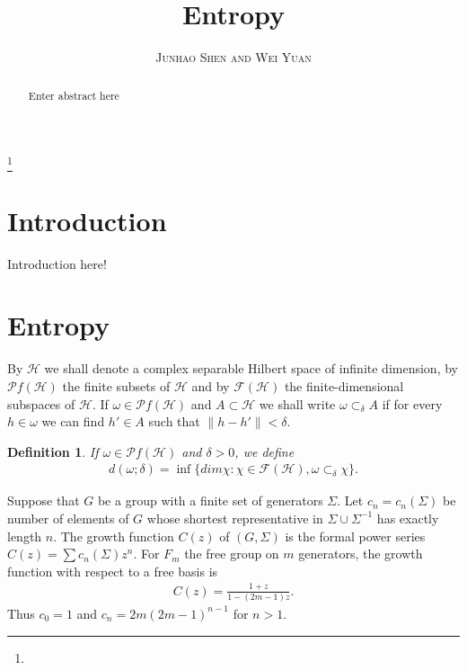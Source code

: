 \documentclass[a4paper,10pt]{amsart}
\newtheorem{definition}{Definition}[section]
\newcommand{\HHH}{\mathscr H} %
\newcommand{\PP}{\mathscr P}
\newcommand{\FF}{\mathscr F}
\newcommand{\titleinfo}{Entropy}
\newcommand{\authorinfo}{Junhao Shen and Wei Yuan}
\begin{document}
\title{\LARGE\textbf{\titleinfo}} 
\author{\large\textsc{\authorinfo}} 
\address{UNH and AMSS}  
\email{}

\date{}

\begin{abstract}
Enter abstract here
\end{abstract}

\thanks{}
\maketitle


\section{Introduction}
Introduction here!


\section{Entropy}
By $\HHH$ we shall denote a complex separable Hilbert space of 
infinite dimension, by $\PP f(\HHH)$ the finite subsets of $\HHH$ and 
by $\FF(\HHH)$ the finite-dimensional subspaces of $\HHH$.
If $\omega \in \PP f(\HHH)$ and $A \subset \HHH$ we shall write
$\omega \subset_{\delta} A$ if for every $h \in \omega$ we can find
$h' \in A$ such that $\| h - h' \| < \delta$.

\begin{definition}
    If $\omega \in \PP f(\HHH)$ and $\delta > 0$, we define
    \begin{align*}
        d(\omega; \delta) = \inf \{dim \chi : \chi \in \FF (\HHH), \omega
        \subset_{\delta} \chi \}.
    \end{align*}
\end{definition}

Suppose that $G$ be a group with a finite set of generators $\Sigma$. 
Let $c_n = c_n(\Sigma)$ be 
number of elements of $G$ whose shortest representative in 
$\Sigma \cup \Sigma^{-1}$ has exactly length $n$. The growth function
$C(z)$ of $(G, \Sigma)$ is the formal power series 
$C(z) = \sum c_n(\Sigma)z^n$.
For $F_m$ the free group on $m$ generators, the growth function
with respect to a free basis is
\begin{align*}
    C(z) = \frac{1+z}{1-(2m-1)z}. 
\end{align*}
Thus $c_0 = 1$ and $c_n = 2m(2m-1)^{n-1}$ for $n > 1$.
\end{document}
